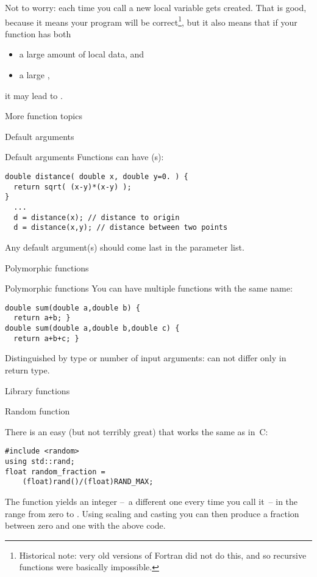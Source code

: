 Not to worry: each time you call  a new local variable
 gets created. That is good, because it means your program
will be correct\footnote{Historical note: very old versions of Fortran
  did not do this, and so recursive functions were basically
  impossible.}, but it also means that if your function has both
\begin{itemize}
\item a large amount of local data, and
\item a large ,
\end{itemize}
it may lead to .

 {More function topics}

 {Default arguments}

\begin{block}{Default arguments}
  \label{sl:def-arg}
  Functions can have (s):
\begin{verbatim}
double distance( double x, double y=0. ) {
  return sqrt( (x-y)*(x-y) );
}
  ...
  d = distance(x); // distance to origin
  d = distance(x,y); // distance between two points
\end{verbatim}
Any default argument(s) should come last in the parameter list.
\end{block}

 {Polymorphic functions}
\label{sec:polyfunc}

\begin{block}{Polymorphic functions}
  \label{sl:func-poly}
  You can have multiple functions with the same name:
\begin{verbatim}
double sum(double a,double b) {
  return a+b; }
double sum(double a,double b,double c) {
  return a+b+c; }
\end{verbatim}
Distinguished by type or number of input arguments: can not differ only in return type.
\end{block}

 {Library functions}

 {Random function}
\label{sed:crand}

There is an easy (but not terribly great)  that
works the same as in~C:

\begin{verbatim}
#include <random>
using std::rand;
float random_fraction =
    (float)rand()/(float)RAND_MAX;
\end{verbatim}
The function  yields an integer --~a different one
every time you call it~-- in the range from zero to
.
Using scaling and casting you can then produce a fraction between zero
and one with the above code.

